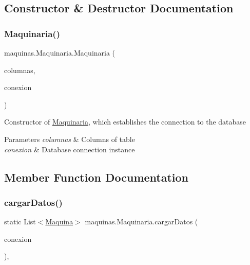 \subsection{Constructor \& Destructor Documentation}
\mbox{\label{classmaquinas_1_1_maquinaria_adf1a7cb67d56325ab9689a85945a17bd}} 
\subsubsection{\texorpdfstring{Maquinaria()}{Maquinaria()}}
{\footnotesize\ttfamily maquinas.\+Maquinaria.\+Maquinaria (\begin{DoxyParamCaption}\item[{\mbox{\hyperlink{classmaquinas_1_1_modelo_columnas_tabla_maquina}{Modelo\+Columnas\+Tabla\+Maquina}}}]{columnas,  }\item[{\mbox{\hyperlink{classconexion_s_q_l_1_1_my_data_access}{My\+Data\+Access}}}]{conexion }\end{DoxyParamCaption})\hspace{0.3cm}{\ttfamily [inline]}}

Constructor of \mbox{\hyperlink{classmaquinas_1_1_maquinaria}{Maquinaria}}, which establishes the connection to the database 
\begin{DoxyParams}{Parameters}
{\em columnas} & Columns of table \\
\hline
{\em conexion} & Database connection instance \\
\hline
\end{DoxyParams}


\subsection{Member Function Documentation}
\mbox{\label{classmaquinas_1_1_maquinaria_a8c8ade68894e4e32e50a0130d482bc5e}} 
\subsubsection{\texorpdfstring{cargar\+Datos()}{cargarDatos()}}
{\footnotesize\ttfamily static List$<$\mbox{\hyperlink{classmaquinas_1_1_maquina}{Maquina}}$>$ maquinas.\+Maquinaria.\+cargar\+Datos (\begin{DoxyParamCaption}\item[{\mbox{\hyperlink{classconexion_s_q_l_1_1_my_data_access}{My\+Data\+Access}}}]{conexion }\end{DoxyParamCaption})\hspace{0.3cm}{\ttfamily [inline]}, {\ttfamily [static]}}

